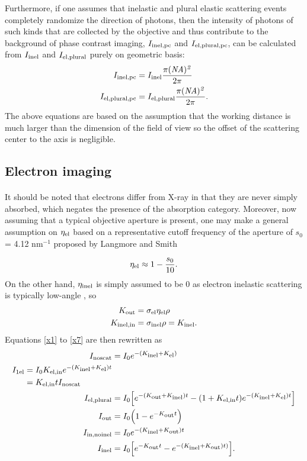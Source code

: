 \documentclass[review]{elsarticle}
\newcommand\nt{\textup{\scriptsize{0}}}
\newcommand\el{\textup{\scriptsize{el}}}
\newcommand\inel{\textup{\scriptsize{inel}}}
\newcommand\elin{\textup{\scriptsize{el,in}}}
\newcommand\inelin{\textup{\scriptsize{inel,in}}}
\newcommand\out{\textup{\scriptsize{out}}}
\newcommand\noscat{\textup{\scriptsize{noscat}}}
\newcommand\sel{\textup{\scriptsize{1el}}}
\newcommand\elpl{\textup{\scriptsize{el,plural}}}
\newcommand\innoinel{\textup{\scriptsize{in,noinel}}}
\newcommand\inelpc{\textup{\scriptsize{inel,pc}}}
\newcommand\elplpc{\textup{\scriptsize{el,plural,pc}}}
\begin{document}
Furthermore, if one assumes that inelastic and plural elastic scattering events completely randomize the direction of photons, then the intensity of photons of such kinds that are collected by the objective and thus contribute to the background of phase contrast imaging, $I_{\inelpc}$ and $I_{\elplpc}$, can be calculated from $I_{\inel}$ and $I_{\elpl}$ purely on geometric basis:
\begin{align}
I_{\inelpc} &= I_{\inel}\frac{\pi (\it{NA})^2}{2\pi} \\
I_{\elplpc} &= I_{\elpl}\frac{\pi (\it{NA})^2}{2\pi}.
\end{align}
The above equations are based on the assumption that the working distance is much larger than the dimension of the field of view so the offset of the scattering center to the axis is negligible. 

\subsection{Electron imaging}

\paragraph{} It should be noted that electrons differ from X-ray in that they are never simply absorbed, which negates the presence of the absorption category. Moreover, now assuming that a typical objective aperture is present, one may make a general assumption on $\eta_\el$ based on a representative cutoff frequency of the aperture of $s_0$ = 4.12 $\mathrm{nm}^{-1}$ proposed by Langmore and Smith \cite{Langmore:1992kk}

\begin{equation}
\eta_\el \approx 1 - \frac{s_0}{10}.
\end{equation}
On the other hand, $\eta_\inel$ is simply assumed to be 0 as electron inelastic scattering is typically low-angle \cite{Williams:2006434}, so
\begin{align}
K_\out &= \sigma_\el \eta_\el \rho \\
K_\inelin &= \sigma_\inel \rho = K_\inel.
\end{align}
Equations \ref{x1} to \ref{x7} are then rewritten as \cite{Jacobsen:1998vj}
\begin{align}
I_{\noscat} &= I_{\nt}e^{-(K_{\inel}+K_{\el})}
\label{e1} \\
\begin{split}
\label{e2}
I_{\sel} &= I_{\nt}K_{\elin}e^{-(K_{\inel}+K_{\el})t} 
	\\ &= K_{\elin}tI_{\noscat} 
\end{split} \\
I_{\elpl} &= I_{\nt} \Big[ e^{-(K_{\out}+K_{\inel})t} - (1+K_{\elin}t)e^{-(K_{\inel}+K_{\el})t} \Big]
\label{e3} \\
I_{\out} &= I_{\nt} \Big(1 - e^{-K_{\out}t}\Big)
\label{e4} \\
I_{\innoinel} &= I_{\nt}e^{-(K_{\inel}+K_{\out})t}
\label{e6} \\
I_{\inel} &= I_{\nt}\Big[e^{-K_{\out}t} - e^{-(K_{\inel}+K_{\out})t)}\Big].
\label{e7}
\end{align}
\end{document}
